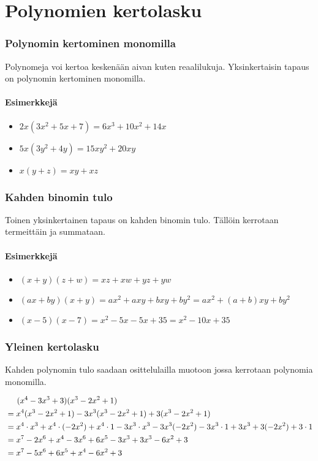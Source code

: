 \chapter{Polynomien kertolasku}

\subsection*{Polynomin kertominen monomilla}

Polynomeja voi kertoa keskenään aivan kuten reaalilukuja. Yksinkertaisin tapaus on polynomin kertominen monomilla.

\subsubsection*{Esimerkkejä}
\begin{itemize}
    \item $2x(3x^2+5x+7) = 6x^3+10x^2+14x$
    \item $5x(3y^2+4y) = 15xy^2+20xy$
    \item $x(y+z) = xy+xz$
\end{itemize}

\subsection*{Kahden binomin tulo}

Toinen yksinkertainen tapaus on kahden binomin tulo. Tällöin kerrotaan termeittäin ja summataan.

\subsubsection*{Esimerkkejä}
\begin{itemize}
    \item $(x+y)(z+w) = xz+xw+yz+yw$
    \item $(ax+by)(x+y) = ax^2+axy+bxy+by^2 = ax^2+(a+b)xy+by^2$
    \item $(x-5)(x-7) = x^2-5x-5x+35 = x^2-10x+35$
\end{itemize}

\subsection*{Yleinen kertolasku}
Kahden polynomin tulo saadaan osittelulailla muotoon jossa kerrotaan polynomia
monomilla.
\begin{esimerkki}
\begin{align*}
&\hspace{0.5cm}(x^4-3x^3+3)(x^3-2x^2+1) \\
&= x^4 (x^3-2x^2+1) - 3x^3 (x^3-2x^2+1) + 3 (x^3-2x^2+1) \\
&= x^4\cdot x^3 + x^4\cdot (-2x^2)+x^4\cdot 1-3x^3\cdot x^3-3x^3(-2x^2)-3x^3\cdot1+3x^3+3(-2x^2)+3\cdot 1 \\
&= x^7-2x^6+x^4-3x^6+6x^5-3x^3+3x^3-6x^2+3 \\
&= x^7-5x^6+6x^5+x^4-6x^2+3
\end{align*}
\end{esimerkki}

